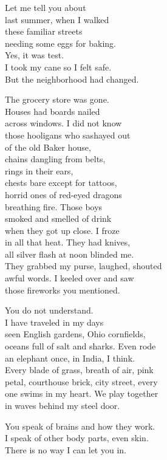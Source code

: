 \documentclass[twoside,10pt]{book}
\begin{document}
Let me tell you about\\
last summer, when I walked\\
these familiar streets\\
needing some eggs for baking.\\
Yes, it was test.\\
I took my cane so I felt safe.\\
But the neighborhood had changed.

The grocery store was gone.\\
Houses had boards nailed\\
across windows. I did not know\\
those hooligans who sashayed out\\
of the old Baker house,\\
chains dangling from belts,\\
rings in their ears,\\
chests bare except for tattoos,\\
horrid ones of red-eyed dragons\\
breathing fire. Those boys\\
smoked and smelled of drink\\
when they got up close. I froze\\
in all that heat. They had knives,\\
all silver flash at noon blinded me.\\
They grabbed my purse, laughed, shouted\\
awful words. I keeled over and saw\\
those fireworks you mentioned.

You do not understand.\\
I have traveled in my days\\
seen English gardens, Ohio cornfields,\\
oceans full of salt and sharks. Even rode\\
an elephant once, in India, I think.\\
Every blade of grass, breath of air, pink\\
petal, courthouse brick, city street, every\\
one swims in my heart. We play together\\
in waves behind my steel door.

You speak of brains and how they work.\\
I speak of other body parts, even skin.\\
There is no way I can let you in.
\end{document}
